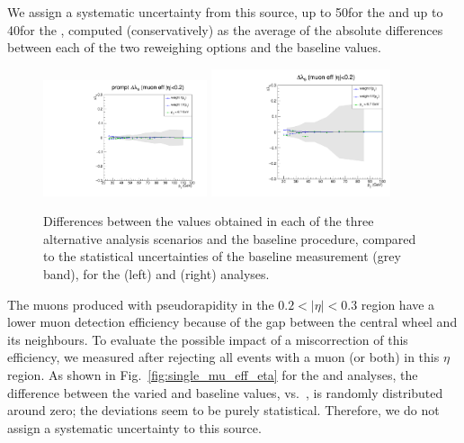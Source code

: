We assign a systematic uncertainty from this source, 
up to 50\GeV for the \jpsi and up to 40\GeV for the \psip, 
computed (conservatively) as the average of the absolute differences between 
each of the two reweighing options and the baseline values.

\begin{figure}[h]
\centering
\includegraphics[width=0.43\textwidth]{Figures/chapter6/lth_absDiff_muEff-jpsi.pdf}
\includegraphics[width=0.47\textwidth]{Figures/chapter6/lth_absDiff_muEff-psip.pdf}
\caption{Differences between the \lth values obtained in each of the three alternative
analysis scenarios and the baseline procedure, compared to the statistical uncertainties
of the baseline measurement (grey band), for the \jpsi (left) and \psip (right) analyses.}
\label{fig:single_mu_eff_syst2}
\end{figure}

The muons produced with pseudorapidity in the $0.2 < |\eta| < 0.3$ region 
have a lower muon detection efficiency because of the gap between the central wheel 
and its neighbours.
To evaluate the possible impact of a miscorrection of this efficiency,
we measured \lth after rejecting all events with a muon (or both) in this $\eta$ region.
As shown in Fig.~\ref{fig:single_mu_eff_eta} for the \jpsi and \psip analyses,
the difference between the varied and baseline \lth values, vs.\ \pt,
is randomly distributed around zero; the deviations seem to be purely statistical.
Therefore, we do not assign a systematic uncertainty to this source.

